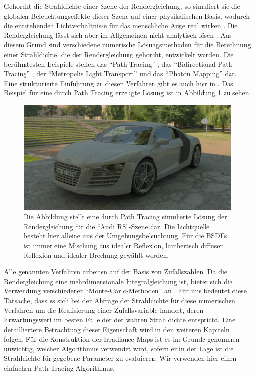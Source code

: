 		Gehorcht die Strahldichte einer Szene der Rendergleichung, so simuliert sie die globalen Beleuchtungseffekte dieser Szene auf einer physikalischen Basis, wodurch die entstehenden Lichtverhältnisse für das menschliche Auge real wirken \cite{kajiya-lte,pbrt3,veach-thesis}.
		Die Rendergleichung lässt sich aber im Allgemeinen nicht analytisch lösen \cite{pbrt3,veach-thesis,kajiya-lte}.
		Aus diesem Grund sind verschiedene numerische Lösungsmethoden für die Berechnung einer Strahldichte, die der Rendergleichung gehorcht, entwickelt worden.
		Die berühmtesten Beispiele stellen das \enquote{Path Tracing} \cite{kajiya-lte}, das \enquote{Bidirectional Path Tracing} \cite{bidirectional-path-tracing}, der \enquote{Metropolis Light Transport} \cite{veach-mlt} und das \enquote{Photon Mapping} \cite{course-photon-map} dar.
		Eine strukturierte Einführung zu diesen Verfahren gibt es auch hier in \cite{pbrt3}.
		Das Beispiel für eine durch Path Tracing erzeugte Lösung ist in Abbildung \ref{fig:example-audi-r8-pt} zu sehen.

		\begin{figure}[h]
			\center
			\includegraphics[scale=0.4]{pic/example-audi_r8-pt.png}
			\caption{Die Abbildung stellt eine durch Path Tracing simulierte Lösung der Rendergleichung für die \enquote{Audi R8}-Szene dar. Die Lichtquelle besteht hier alleine aus der Umgebungsbeleuchtung. Für die BSDFs ist immer eine Mischung aus idealer Reflexion, lambertsch diffuser Reflexion und idealer Brechung gewählt worden.}
			\label{fig:example-audi-r8-pt}
		\end{figure}

		Alle genannten Verfahren arbeiten auf der Basis von Zufallszahlen.
		Da die Rendergleichung eine mehrdimensionale Integralgleichung ist, bietet sich die Verwendung verschiedener \enquote{Monte-Carlo-Methoden} an \cite{monte-carlo-method}.
		Für uns bedeutet diese Tatsache, dass es sich bei der Abfrage der Strahldichte für diese numerischen Verfahren um die Realisierung einer Zufallsvariable handelt, deren Erwartungswert im besten Falle der der wahren Strahldichte entspricht.
		Eine detailliertere Betrachtung dieser Eigenschaft wird in den weiteren Kapiteln folgen.
		Für die Konstruktion der Irradiance Maps ist es im Grunde genommen unwichtig, welcher Algorithmus verwendet wird, sofern er in der Lage ist die Strahldichte für gegebene Parameter zu evaluieren.
		Wir verwenden hier einen einfachen Path Tracing Algorithmus.

